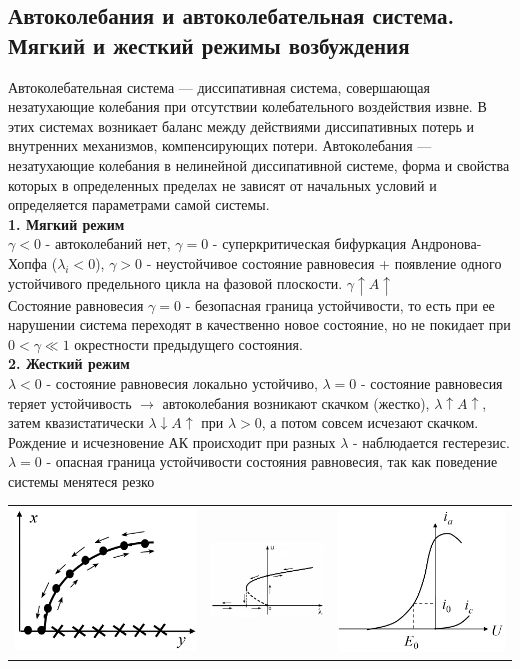 \begin{multicols*}{2}
		\section{Автоколебания и автоколебательная система. Мягкий и жесткий режимы возбуждения}
		Автоколебательная система — диссипативная система, совершающая незатухающие колебания при отсутствии колебательного воздействия извне. В этих системах возникает баланс между действиями диссипативных потерь и внутренних механизмов, компенсирующих потери. Автоколебания — незатухающие колебания в нелинейной диссипативной системе, форма и свойства которых в определенных пределах не зависят от начальных условий и определяется параметрами самой системы.\\
		\textbf{1. Мягкий режим\\}
		$\gamma < 0$ - автоколебаний нет, $\gamma = 0$ - суперкритическая бифуркация Андронова-Хопфа ($\lambda_i < 0$), $\gamma > 0$ - неустойчивое состояние равновесия + появление одного устойчивого предельного цикла на фазовой плоскости. \quad $\gamma \uparrow A \uparrow$\\
		Состояние равновесия $\gamma = 0$ - безопасная граница устойчивости, то есть при ее нарушении система переходят в качественно новое состояние, но не покидает при $0<\gamma \ll 1$ окрестности предыдущего состояния.\\
		\textbf{2. Жесткий режим\\}
		$\lambda< 0$ - состояние равновесия локально устойчиво, $\lambda = 0$ - состояние равновесия теряет устойчивость $\rightarrow$ автоколебания возникают скачком (жестко), $\lambda \uparrow A \uparrow$, затем квазистатически $\lambda \downarrow A \uparrow$ при $\lambda > 0$, а потом совсем исчезают скачком. Рождение и исчезновение АК происходит при разных $\lambda$ - наблюдается гестерезис. $\lambda = 0$ - опасная граница устойчивости состояния равновесия, так как поведение системы менятеся резко\\
		\begin{tabular}{c c c}
			\includegraphics[width=0.3\linewidth]{tk_img/avtokoleb_1.png} & \includegraphics[width=0.35\linewidth]{tk_img/avtokoleb_2.png} & \includegraphics[width=0.28\linewidth]{tk_img/vax.png}\\

\end{tabular}
\end{multicols*}
